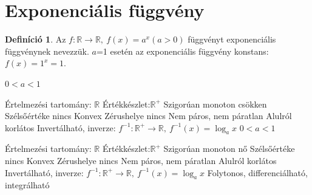 \documentclass[twoside,12pt]{report}
\theoremstyle{definition}
\newtheorem{definition}[theorem]{Definíció}
\begin{document}
\section{Exponenciális függvény}
	\begin{definition}
		Az $f:\mathbb{R}\longrightarrow\mathbb{R},\ f(x)=a^x(a>0)$ függvényt exponenciális függvénynek nevezzük. $a$=1 esetén az exponenciális függvény konstans: $f(x)=1^x=1$.
	\end{definition}
	\begin{outline}
		\1 $0<a<1$
			\2[] 
			\2 Értelmezési tartomány: $\mathbb{R}$
			\2 Értékkészlet:$\mathbb{R}^+$
			\2 Szigorúan monoton csökken
			\2 Szélsőértéke nincs
			\2 Konvex
			\2 Zérushelye nincs
			\2 Nem páros, nem páratlan
			\2 Alulról korlátos
			\2 Invertálható, inverze: $f^{-1}:\mathbb{R}^+\longrightarrow\mathbb{R},\ f^{-1}(x)=\log_ax$
		\1 $0<a<1$
			\2[] 
		\2 Értelmezési tartomány: $\mathbb{R}$
		\2 Értékkészlet:$\mathbb{R}^+$
		\2 Szigorúan monoton nő
		\2 Szélsőértéke nincs
		\2 Konvex
		\2 Zérushelye nincs
		\2 Nem páros, nem páratlan
		\2 Alulról korlátos
		\2 Invertálható, inverze: $f^{-1}:\mathbb{R}^+\longrightarrow\mathbb{R},\ f^{-1}(x)=\log_ax$
	\1 Folytonos, differenciálható, integrálható
	\end{outline}
\end{document}
